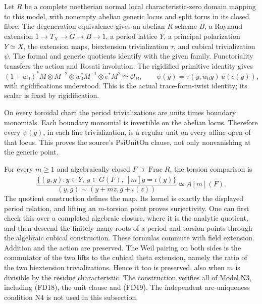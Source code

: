 Let \(R\) be a complete noetherian normal local characteristic-zero
domain mapping to this model, with nonempty abelian generic locus
and split torus in its closed fibre.
The degeneration equivalence gives an abelian \(R\)-scheme \(B\),
a Raynaud extension \(1\to T_X\to\widetilde G\to B\to1\), a period
lattice \(Y\), a principal polarization \(Y\simeq X\), the
extension maps, biextension trivialization \(\tau\), and cubical
trivialization \(\psi\).
The formal and generic quotients identify with the given family.
Functoriality transfers the action and Rosati involution.
The rigidified primitive identity gives
\[
 (1+w_0)^*M\otimes M^{-2}\otimes w_0^*M^{-1}\otimes e^*M^2
     \simeq\mathcal O_B,\qquad
                 \psi(y)=\tau(y,w_0y)\,u(c(y)),
 \tag{FD18}
\]
with rigidifications understood.
This is the actual trace-form-twist identity; its scalar is
fixed by rigidification.

On every toroidal chart the period trivializations are units
times boundary monomials.  Each boundary monomial is invertible
on the abelian locus.  Therefore every \(\psi(y)\), in each
line trivialization, is a regular unit on every affine open
of that locus.  This proves the source's \(\mathrm{PsiUnitOn}\)
clause, not only nonvanishing at the generic point.

For every \(m\ge1\) and algebraically closed
\(F\supset\operatorname{Frac}R\), the torsion comparison is
\[
 \frac{\{(y,g):y\in Y,\ g\in\widetilde G(F),\
                                  [m]g=\iota(y)\}}
      {(y,g)\sim(y+mz,g+\iota(z))}
                                      \simeq A[m](F).
 \tag{FD19}
\]
The quotient construction defines the map.
Its kernel is exactly the displayed period relation, and lifting
an \(m\)-torsion point proves surjectivity.
One can first check this over a completed algebraic closure,
where it is the analytic quotient, and then descend the finitely
many roots of a period and torsion points through the algebraic
cubical construction.  These formulas commute with field
extension.  Addition and the action are preserved.
The Weil pairing on both sides is the commutator of the two
lifts to the cubical theta extension, namely the ratio of the
two biextension trivializations.  Hence it too is preserved,
also when \(m\) is divisible by the residue characteristic.
The construction verifies all of \(\mathrm{Model.N3}\),
including (FD18), the unit clause and (FD19).
The independent arc-uniqueness condition \(\mathrm{N4}\) is not
used in this subsection.


